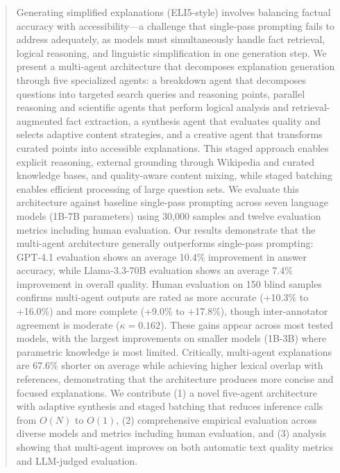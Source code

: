 \begin{abstract}
Generating simplified explanations (ELI5-style) involves balancing factual accuracy with accessibility---a challenge that single-pass prompting fails to address adequately, as models must simultaneously handle fact retrieval, logical reasoning, and linguistic simplification in one generation step. We present a multi-agent architecture that decomposes explanation generation through five specialized agents: a breakdown agent that decomposes questions into targeted search queries and reasoning points, parallel reasoning and scientific agents that perform logical analysis and retrieval-augmented fact extraction, a synthesis agent that evaluates quality and selects adaptive content strategies, and a creative agent that transforms curated points into accessible explanations. This staged approach enables explicit reasoning, external grounding through Wikipedia and curated knowledge bases, and quality-aware content mixing, while staged batching enables efficient processing of large question sets. We evaluate this architecture against baseline single-pass prompting across seven language models (1B-7B parameters) using 30,000 samples and twelve evaluation metrics including human evaluation. Our results demonstrate that the multi-agent architecture generally outperforms single-pass prompting: GPT-4.1 evaluation shows an average 10.4\% improvement in answer accuracy, while Llama-3.3-70B evaluation shows an average 7.4\% improvement in overall quality. Human evaluation on 150 blind samples confirms multi-agent outputs are rated as more accurate (+10.3\% to +16.0\%) and more complete (+9.0\% to +17.8\%), though inter-annotator agreement is moderate ($\kappa=0.162$). These gains appear across most tested models, with the largest improvements on smaller models (1B-3B) where parametric knowledge is most limited. Critically, multi-agent explanations are 67.6\% shorter on average while achieving higher lexical overlap with references, demonstrating that the architecture produces more concise and focused explanations. We contribute (1) a novel five-agent architecture with adaptive synthesis and staged batching that reduces inference calls from $O(N)$ to $O(1)$, (2) comprehensive empirical evaluation across diverse models and metrics including human evaluation, and (3) analysis showing that multi-agent improves on both automatic text quality metrics and LLM-judged evaluation.
\end{abstract}
